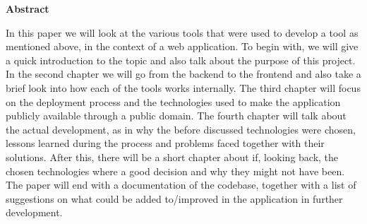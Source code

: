 \newpage

\vspace*{1cm}

\begin{center}
    \textbf{Abstract}
\end{center}

\vspace*{1cm}

\noindent
In this paper we will look at the various tools that were used to develop a tool as mentioned above, in the context of a web application. To begin with, we will give a quick introduction to the topic and also talk about the purpose of this project. In the second chapter we will go from the backend to the frontend and also take a brief look into how each of the tools works internally. The third chapter will focus on the deployment process and the technologies used to make the application publicly available through a public domain. The fourth chapter will talk about the actual development, as in why the before discussed technologies were chosen, lessons learned during the process and problems faced together with their solutions. After this, there will be a short chapter about if, looking back, the chosen technologies where a good decision and why they might not have been. The paper will end with a documentation of the codebase, together with a list of suggestions on what could be added to/improved in the application in further development.
